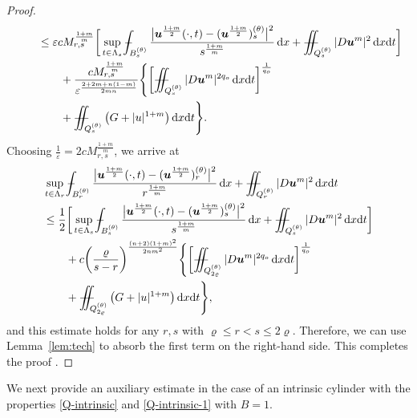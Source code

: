 \documentclass[a4paper, 10pt, american]{amsart}
\numberwithin{theorem}{section}
\numberwithin{equation}{section}
\newcommand{\dxdt}{\,\mathrm{d}x\mathrm{d}t}
\newcommand{\dx}{\,\mathrm{d}x}
\renewcommand{\epsilon}{\varepsilon}
\renewcommand{\epsilon}{\varepsilon}
\renewcommand{\rho}{\varrho}
\newcommand{\power}[2]{\bm{#1^{\mbox{\unboldmath{\scriptsize$#2$}}}}}
\def\Xint#1{\mathchoice
    {\XXint\displaystyle\textstyle{#1}}%
    {\XXint\textstyle\scriptstyle{#1}}%
    {\XXint\scriptstyle\scriptscriptstyle{#1}}%
    {\XXint\scriptscriptstyle\scriptscriptstyle{#1}}%
    \!\int}
\def\XXint#1#2#3{\setbox0=\hbox{$#1{#2#3}{\int}$}
    \vcenter{\hbox{$#2#3$}}\kern-0.5\wd0}
\def\bint{\Xint-}
\def\Xiint#1{\mathchoice
    {\XXiint\displaystyle\textstyle{#1}}%
    {\XXiint\textstyle\scriptstyle{#1}}%
    {\XXiint\scriptstyle\scriptscriptstyle{#1}}%
    {\XXiint\scriptscriptstyle\scriptscriptstyle{#1}}%
    \!\iint}
\def\XXiint#1#2#3{\setbox0=\hbox{$#1{#2#3}{\iint}$}
    \vcenter{\hbox{$#2#3$}}\kern-0.5\wd0}
\def\biint{\Xiint{-\!-}}
\begin{document}
\begin{proof}
\begin{align}
&\qquad\le
\epsilon c M_{r,s}^\frac{1+m}m\bigg[\sup_{t\in\Lambda_s}\bint_{B_s^{(\theta)}}\frac{\big|\power u{\frac{1+m}2}(\cdot,t)-(\power u{\frac{1+m}2})_s^{(\theta)}\big|^2}{s^\frac{1+m}m}\dx
+
\biint_{Q_s^{(\theta)}}|D\power um|^2\dxdt\bigg]\\\nonumber
&\qquad\qquad+
\frac{c M_{r,s}^\frac{1+m}m}{\epsilon^\frac{2+2m+n(1-m)}{2mn}}\Bigg\{\bigg[\biint_{Q_s^{(\theta)}} |D\power um|^{2q_o} \dxdt\bigg]^\frac1{q_o}\\\nonumber
&\qquad\qquad+
\biint_{Q_s^{(\theta)}}\big(G+|u|^{1+m}\big)\dxdt\Bigg\}.
\end{align}
Choosing $\frac1\epsilon=2cM_{r,s}^\frac{1+m}m$, we arrive at 
\begin{align}
\nonumber
&\sup_{t\in\Lambda_r}\bint_{B_r^{(\theta)}}\frac{\big|\power u{\frac{1+m}2}(\cdot,t)-(\power u{\frac{1+m}2})_r^{(\theta)}\big|^2}{r^\frac{1+m}m}\dx
+
\biint_{Q_r^{(\theta)}}|D\power um|^2\dxdt\\\nonumber
&\le
\frac12\bigg[\sup_{t\in\Lambda_s}\bint_{B_s^{(\theta)}}\frac{\big|\power u{\frac{1+m}2}(\cdot,t)-(\power u{\frac{1+m}2})_s^{(\theta)}\big|^2}{s^\frac{1+m}m}\dx
+
\biint_{Q_s^{(\theta)}}|D\power um|^2\dxdt\bigg]\\\nonumber
&\qquad+
c\bigg(\frac{\rho}{s-r}\bigg)^\frac{(n+2)(1+m)^2}{2nm^2}\Bigg\{\bigg[\biint_{Q_{2\rho}^{(\theta)}} |D\power um|^{2q_o} \dxdt\bigg]^\frac1{q_o}\\\nonumber
&\qquad+
\biint_{Q_{2\rho}^{(\theta)}}\big(G+|u|^{1+m}\big)\dxdt\Bigg\},
\end{align}
and this estimate holds for any $r,s$ with $\rho\le r<s\le2\rho$.
Therefore, we can use Lemma~\ref{lem:tech} to absorb the first term on
the right-hand side. This completes the proof .
\end{proof}


We next provide an auxiliary estimate in the case of an intrinsic
cylinder with the properties \eqref{Q-intrinsic} and \eqref{Q-intrinsic-1} with $B=1$.
\end{document}

